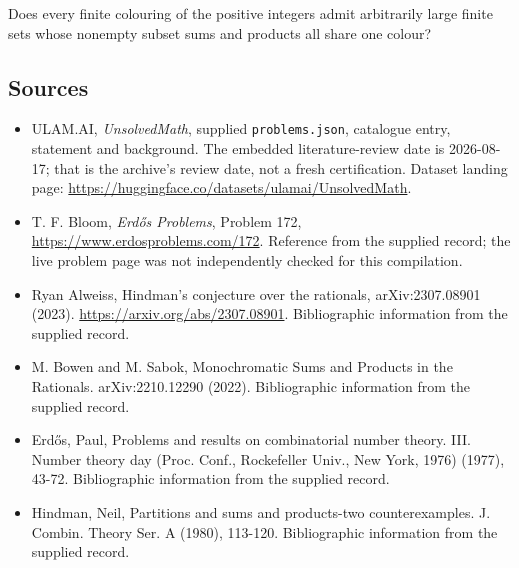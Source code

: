 \documentclass[11pt,a4paper]{article}
\begin{document}
Does every finite colouring of the positive integers admit arbitrarily large finite sets whose nonempty subset sums and products all share one colour?

\subsection{Sources}

{\small

\begin{itemize}

\item[\hypertarget{source:statement:1}{S1}] ULAM.AI, \emph{UnsolvedMath}, supplied \texttt{problems.json}, catalogue entry, statement and background. The embedded literature-review date is 2026-08-17; that is the archive’s review date, not a fresh certification. Dataset landing page: \url{https://huggingface.co/datasets/ulamai/UnsolvedMath}.

\item[\hypertarget{source:statement:2}{S2}] T. F. Bloom, \emph{Erdős Problems}, Problem 172, \url{https://www.erdosproblems.com/172}. Reference from the supplied record; the live problem page was not independently checked for this compilation.

\item[\hypertarget{source:statement:3}{S3}] Ryan Alweiss, Hindman's conjecture over the rationals, arXiv:2307.08901 (2023). \url{https://arxiv.org/abs/2307.08901}. Bibliographic information from the supplied record.

\item[\hypertarget{source:statement:4}{S4}] M. Bowen and M. Sabok, Monochromatic Sums and Products in the Rationals. arXiv:2210.12290 (2022). Bibliographic information from the supplied record.

\item[\hypertarget{source:statement:5}{S5}] Erd\H{o}s, Paul, Problems and results on combinatorial number theory. III. Number theory day (Proc. Conf., Rockefeller Univ., New York, 1976) (1977), 43-72. Bibliographic information from the supplied record.

\item[\hypertarget{source:statement:6}{S6}] Hindman, Neil, Partitions and sums and products-two counterexamples. J. Combin. Theory Ser. A (1980), 113-120. Bibliographic information from the supplied record.

\end{itemize}

}

\label{end:statement}
\end{document}
